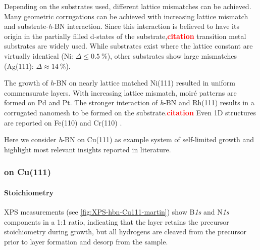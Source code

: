  Depending on the substrates used, different lattice mismatches can be achieved. Many geometric corrugations can be achieved with increasing lattice mismatch and substrate-\textit{h}-BN interaction. Since this interaction is believed to have its origin in the partially filled d-states of the substrate,\textcolor{red}{\textbf{citation}} transition metal substrates are widely used. While substrates exist where the lattice constant are virtually identical (Ni: $\Delta \leq \SI{0.5}{\percent}$), other substrates show large mismatches (Ag(111): $\Delta \approx \SI{14}{\percent}$).

The growth of \textit{h}-BN on nearly lattice matched Ni(111) resulted in uniform commensurate layers. With increasing lattice mismatch, moir\'e patterns are formed on Pd and Pt. The stronger interaction of \textit{h}-BN and Rh(111) results in a corrugated nanomesh to be formed on the substrate.\textcolor{red}{\textbf{citation}} Even 1D structures are reported on Fe(110) \cite{vinogradov_one-dimensional_2012} and Cr(110) \cite{muller_one-dimensional_2008}. 

Here we consider \textit{h}-BN on Cu(111) as example system of self-limited growth and highlight most relevant insights reported in literature.\cite{joshi_boron_2012, schwarz_corrugation_2017, auwarter_hexagonal_2018}

\subsubsection{on Cu(111)}
%	

	\paragraph{Stoichiometry}
	XPS measurements (see \autoref{fig:XPS-hbn-Cu111-martin}) show B\textit{1s} and N\textit{1s} components in a 1:1 ratio, indicating that the layer retains the precursor stoichiometry during growth, but all hydrogens are cleaved from the precursor prior to layer formation and desorp from the sample.\cite{Zhang_Two-dimensional_2017}
	
